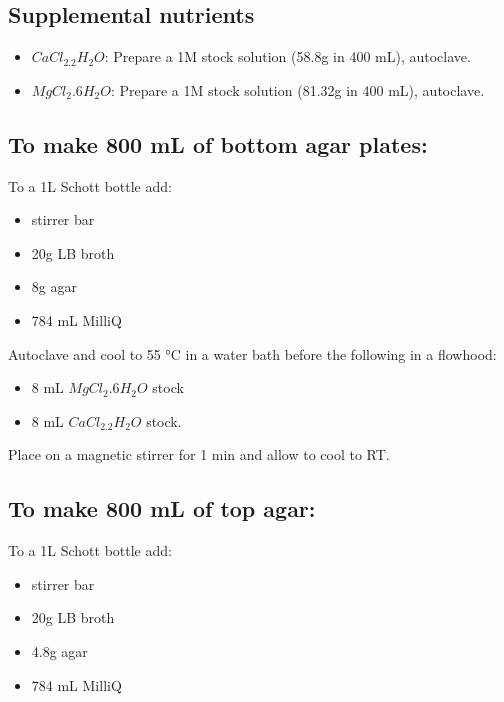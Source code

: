 \documentclass[
]{book}
\providecommand{\tightlist}{%
  \setlength{\itemsep}{0pt}\setlength{\parskip}{0pt}}
\begin{document}
\hypertarget{supplemental-nutrients}{%
\subsection{Supplemental nutrients}\label{supplemental-nutrients}}

\begin{itemize}
\tightlist
\item
  \(CaCl_2.2H_{2}O\): Prepare a 1M stock solution (58.8g in 400 mL), autoclave.
\item
  \(MgCl_{2}.6H_{2}O\): Prepare a 1M stock solution (81.32g in 400 mL), autoclave.
\end{itemize}

\hypertarget{to-make-800-ml-of-bottom-agar-plates}{%
\subsection{To make 800 mL of bottom agar plates:}\label{to-make-800-ml-of-bottom-agar-plates}}

To a 1L Schott bottle add:

\begin{itemize}
\tightlist
\item
  stirrer bar
\item
  20g LB broth
\item
  8g agar
\item
  784 mL MilliQ
\end{itemize}

Autoclave and cool to 55 °C in a water bath before the following in a flowhood:

\begin{itemize}
\tightlist
\item
  8 mL \(MgCl_{2}.6H_{2}O\) stock
\item
  8 mL \(CaCl_2.2H_{2}O\) stock.
\end{itemize}

Place on a magnetic stirrer for 1 min and allow to cool to RT.

\hypertarget{to-make-800-ml-of-top-agar}{%
\subsection{To make 800 mL of top agar:}\label{to-make-800-ml-of-top-agar}}

To a 1L Schott bottle add:

\begin{itemize}
\tightlist
\item
  stirrer bar
\item
  20g LB broth
\item
  4.8g agar
\item
  784 mL MilliQ
\end{itemize}
\end{document}
